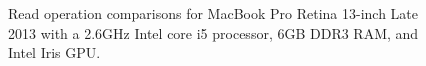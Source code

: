 \begin{figure}[!htb]
\centering
{}


\caption{Read operation comparisons for MacBook Pro Retina 13-inch Late 2013 with a 2.6GHz Intel core i5 processor, 6GB DDR3 RAM, and Intel Iris GPU.
\label{fig:perf-macbook-read}}
\end{figure}

